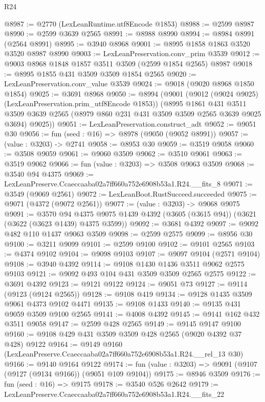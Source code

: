 \begin{lexlean}{R24}
\begin{coremodule}
@8987 := @2770 (LexLeanRuntime.utf8Encode @1853)
@8988 := @2599 @8987
@8990 := @2599 @3639 @2565
@8991 := @8988 @8990
@8994 := @8984 @8991 (@2564 @8991)
@8995 := @3940 @8968
@9001 := @8995 @1858 @1863 @3520 @3520 @8987 @8990
@9003 := LexLeanPreservation.conv_prim @3539
@9012 := @9003 @8968 @1848 @1857 @3511 @3509 (@2599 @1854 @2565) @8987
@9018 := @8995 @1855 @431 @3509 @3509 @1854 @2565
@9020 := LexLeanPreservation.conv_value @3539
@9024 := @9018 (@9020 @8968 @1850 @1854)
@9025 := @3691 @8968
@9050 := @8994
    (@9001
      (@9012 (@9024 @9025) (LexLeanPreservation.prim_utf8Encode @1853))
      (@8995
        @1861
        @431
        @3511
        @3509
        @3639
        @2565
        (@8979 @860 @231 @431 @3509 @3509 @2565 @3639 @9025 @3694)
        @9025))
@9051 := LexLeanPreservation.construct_adt
@9052 := @9051 @30
@9056 := fun (seed : @16) => @8978 (@9050 (@9052 @8991))
@9057 := (value : @3203) -> @2741
@9058 := @8953 @30
@9059 := @3519 @9058
@9060 := @3508 @9059
@9061 := @9060 @3509
@9062 := @3510 @9061
@9063 := @3519 @9062
@9066 := fun (value : @3203) => @3508 @9063 @3509
@9068 := @3540 @94 @4375
@9069 := LexLeanPreserve.Ccaeccaaba02a7ff660a752e6908b53a1.R24.__fits_8
@9071 := @3549 (@9069 @2561)
@9072 := LexLeanBoot.RustSucceed.succeeded
@9075 := @9071 (@4372 (@9072 @2561))
@9077 := (value : @3203) -> @9068 @9075
@9091 := @3570
    @94
    @4375
    @9075
    @1439
    @4392
    (@3605 (@3615 @94))
    (@3621 (@3622 (@3623 @1439) @4375 @3599))
@9092 := @3681 @4392
@9097 := @9092 @482 @110 @1437 @9063 @3509
@9098 := @2599 @2575
@9099 := @8956 @30
@9100 := @3211 @9099
@9101 := @2599 @9100
@9102 := @9101 @2565
@9103 := @4374 @9102
@9104 := @9098 @9103
@9107 := @9097 @9104 (@2571 @9104)
@9108 := @3940 @4392
@9114 := @9108 @1430 @1436 @3511 @9062 @2575 @9103
@9121 := @9092 @493 @104 @431 @3509 @3509 @2565 @2575
@9122 := @3691 @4392
@9123 := @9121 @9122
@9124 := @9051 @73
@9127 := @9114 (@9123 (@9124 @2565))
@9128 := @9108 @419
@9134 := @9128 @1435 @3509 @9061 @4373 @9102 @4471
@9135 := @9108 @1433
@9140 := @9135 @431 @9059 @3509 @9100 @2565
@9141 := @4008 @4392
@9145 := @9141 @162 @432 @3511 @9058
@9147 := @2599 @428 @2565
@9149 := @9145 @9147 @9100
@9160 := @9108 @429 @431 @3509 @3509 @428 @2565 (@9020 @4392 @37 @428) @9122
@9164 := @9149 @9160 (LexLeanPreserve.Ccaeccaaba02a7ff660a752e6908b53a1.R24.__rel_13 @30)
@9166 := @9140 @9164 @9122
@9174 := fun (value : @3203) => @9091 (@9107 (@9127 (@9134 @9166)) (@9051 @109 @9104))
@9175 := @8946 @3509
@9176 := fun (seed : @16) => @9175
@9178 := @3540 @526 @2642
@9179 := LexLeanPreserve.Ccaeccaaba02a7ff660a752e6908b53a1.R24.__fits_22

\end{coremodule}
\end{lexlean}
